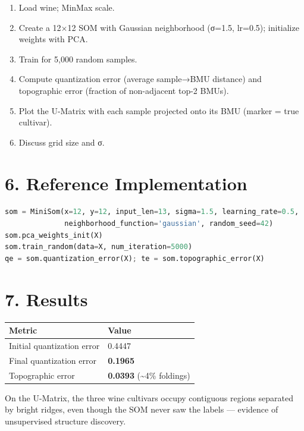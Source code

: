 \begin{enumerate}
\def\labelenumi{\arabic{enumi}.}
\tightlist
\item
  Load wine; MinMax scale.
\item
  Create a 12×12 SOM with Gaussian neighborhood (σ=1.5, lr=0.5);
  initialize weights with PCA.
\item
  Train for 5,000 random samples.
\item
  Compute quantization error (average sample→BMU distance) and
  topographic error (fraction of non-adjacent top-2 BMUs).
\item
  Plot the U-Matrix with each sample projected onto its BMU (marker =
  true cultivar).
\item
  Discuss grid size and σ.
\end{enumerate}

\section{6. Reference Implementation}\label{reference-implementation}

\begin{lstlisting}[language=Python]
som = MiniSom(x=12, y=12, input_len=13, sigma=1.5, learning_rate=0.5,
              neighborhood_function='gaussian', random_seed=42)
som.pca_weights_init(X)
som.train_random(data=X, num_iteration=5000)
qe = som.quantization_error(X); te = som.topographic_error(X)
\end{lstlisting}

\section{7. Results}\label{results}

{\def\LTcaptype{none} %
\begin{longtable}[]{@{}ll@{}}
\toprule\noalign{}
Metric & Value \\
\midrule\noalign{}
\endhead
\bottomrule\noalign{}
\endlastfoot
Initial quantization error & 0.4447 \\
Final quantization error & \textbf{0.1965} \\
Topographic error & \textbf{0.0393} (\textasciitilde4\% foldings) \\
\end{longtable}
}

On the U-Matrix, the three wine cultivars occupy contiguous regions
separated by bright ridges, even though the SOM never saw the labels ---
evidence of unsupervised structure discovery.

